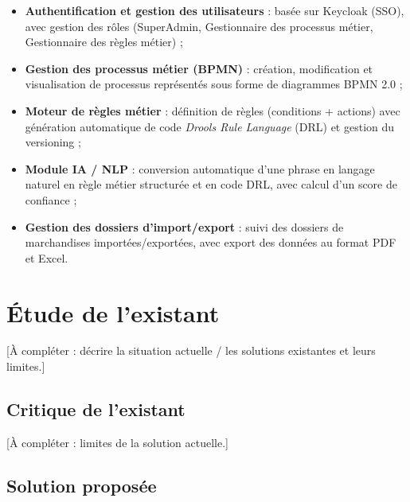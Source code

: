 \begin{itemize}
    \item \textbf{Authentification et gestion des utilisateurs} : bas\'ee
    sur Keycloak (SSO), avec gestion des r\^oles (SuperAdmin,
    Gestionnaire des processus m\'etier, Gestionnaire des r\`egles
    m\'etier) ;
    \item \textbf{Gestion des processus m\'etier (BPMN)} : cr\'eation,
    modification et visualisation de processus repr\'esent\'es sous forme
    de diagrammes BPMN 2.0 ;
    \item \textbf{Moteur de r\`egles m\'etier} : d\'efinition de r\`egles
    (conditions + actions) avec g\'en\'eration automatique de code
    \textit{Drools Rule Language} (DRL) et gestion du versioning ;
    \item \textbf{Module IA / NLP} : conversion automatique d'une phrase
    en langage naturel en r\`egle m\'etier structur\'ee et en code DRL,
    avec calcul d'un score de confiance ;
    \item \textbf{Gestion des dossiers d'import/export} : suivi des
    dossiers de marchandises import\'ees/export\'ees, avec export des
    donn\'ees au format PDF et Excel.
\end{itemize}

\section{\'Etude de l'existant}

[\`A compl\'eter : d\'ecrire la situation actuelle / les solutions existantes
et leurs limites.]

\subsection{Critique de l'existant}

[\`A compl\'eter : limites de la solution actuelle.]

\subsection{Solution propos\'ee}

